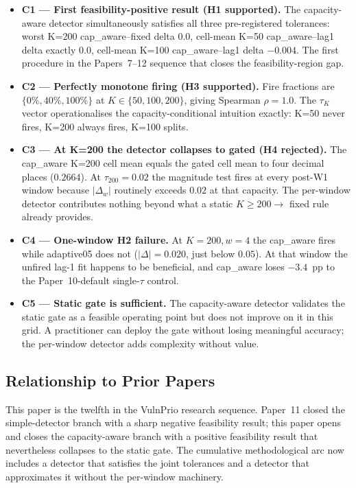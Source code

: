 \begin{itemize}
\item \textbf{C1 --- First feasibility-positive result (H1 supported).}
The capacity-aware detector simultaneously satisfies all three
pre-registered tolerances: worst K=200 cap\_aware--fixed delta $0.0$,
cell-mean K=50 cap\_aware--lag1 delta exactly $0.0$, cell-mean K=100
cap\_aware--lag1 delta $-0.004$. The first procedure in the
Papers~7--12 sequence that closes the feasibility-region gap.

\item \textbf{C2 --- Perfectly monotone firing (H3 supported).} Fire
fractions are $\{0\%, 40\%, 100\%\}$ at $K \in \{50, 100, 200\}$,
giving Spearman $\rho = 1.0$. The $\tau_K$ vector operationalises
the capacity-conditional intuition exactly: K=50 never fires, K=200
always fires, K=100 splits.

\item \textbf{C3 --- At K=200 the detector collapses to gated (H4
rejected).} The cap\_aware K=200 cell mean equals the gated cell mean
to four decimal places ($0.2664$). At $\tau_{200} = 0.02$ the
magnitude test fires at every post-W1 window because $|\Delta_w|$
routinely exceeds $0.02$ at that capacity. The per-window detector
contributes nothing beyond what a static $K \geq 200 \to$ fixed rule
already provides.

\item \textbf{C4 --- One-window H2 failure.} At $K=200, w=4$ the
cap\_aware fires while adaptive05 does not ($|\Delta| = 0.020$, just
below $0.05$). At that window the unfired lag-1 fit happens to be
beneficial, and cap\_aware loses $-3.4$~pp to the Paper~10-default
single-$\tau$ control.

\item \textbf{C5 --- Static gate is sufficient.} The capacity-aware
detector validates the static gate as a feasible operating point but
does not improve on it in this grid. A practitioner can deploy the
gate without losing meaningful accuracy; the per-window detector
adds complexity without value.
\end{itemize}

\subsection{Relationship to Prior Papers}

This paper is the twelfth in the VulnPrio research sequence. Paper~11
closed the simple-detector branch with a sharp negative feasibility
result; this paper opens and closes the capacity-aware branch with
a positive feasibility result that nevertheless collapses to the
static gate. The cumulative methodological arc now includes a
detector that satisfies the joint tolerances and a detector that
approximates it without the per-window machinery.
